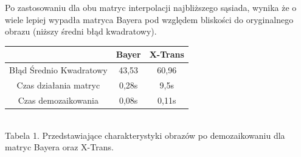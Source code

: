 \documentclass[14pt]{article}
\begin{document}
\begin{center}
    Po zastosowaniu dla obu matryc interpolacji najbliższego sąsiada, wynika że o wiele
    lepiej wypadła matryca Bayera pod względem bliskości do 
    oryginalnego obrazu (niższy średni błąd kwadratowy). 




    \vspace{0.25cm}
    \begin{tabular}{|c|c|c|}
        \hline
        & Bayer & X-Trans  \\ \hline
        Błąd Średnio Kwadratowy & 43,53 & 60,96 \\ \hline
        Czas działania matryc & 0,28s & 9,5s \\ \hline
        Czas demozaikowania & 0,08s & 0,11s \\ \hline

    \end{tabular}
    \vspace{0.2cm}
    \\ \small Tabela 1. Przedstawiające charakterystyki 
    obrazów po demozaikowaniu dla matryc Bayera oraz X-Trans.
\end{center}
\end{document}

